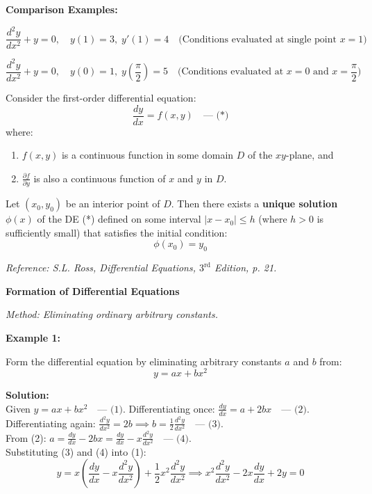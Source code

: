 \documentclass[11pt,a4paper]{article}
\newcommand{\Heading}[1]{\vspace{0.3cm}\noindent\textbf{\textcolor{AcademicGreen}{\large #1}}\par\vspace{0.15cm}}
\begin{document}
\Heading{Comparison Examples:}
\begin{description}[leftmargin=0.4cm, font=\normalfont\bfseries\textcolor{DarkGreen}]
    \item[Initial Value Problem (IVP):]
    \[ \frac{d^2y}{dx^2} + y = 0, \quad y(1) = 3, \; y'(1) = 4 \quad \text{(Conditions evaluated at single point } x=1) \]
    
    \item[Boundary Value Problem (BVP):]
    \[ \frac{d^2y}{dx^2} + y = 0, \quad y(0) = 1, \; y\left(\frac{\pi}{2}\right) = 5 \quad \text{(Conditions evaluated at } x=0 \text{ and } x=\frac{\pi}{2}) \]
\end{description}

\vspace{0.3cm}
\begin{tcolorbox}[theorembox, title={Existence and Uniqueness Theorem}]
Consider the first-order differential equation:
\[ \frac{dy}{dx} = f(x, y) \quad \text{--- (*)} \]
where:
\begin{enumerate}[label=\arabic*)]
    \item $f(x, y)$ is a continuous function in some domain $D$ of the $xy$-plane, and
    \item $\frac{\partial f}{\partial y}$ is also a continuous function of $x$ and $y$ in $D$.
\end{enumerate}
Let $(x_0, y_0)$ be an interior point of $D$. Then there exists a \textbf{unique solution} $\phi(x)$ of the DE (*) defined on some interval $|x - x_0| \le h$ (where $h > 0$ is sufficiently small) that satisfies the initial condition:
\[ \phi(x_0) = y_0 \]
\end{tcolorbox}
\textit{Reference: S.L. Ross, Differential Equations, $3^{\text{rd}}$ Edition, p. 21.}

\newpage


\Heading{Formation of Differential Equations}
\textit{Method: Eliminating ordinary arbitrary constants.}

\Heading{Example 1:}
Form the differential equation by eliminating arbitrary constants $a$ and $b$ from:
\[ y = ax + bx^2 \]

\noindent\textbf{Solution:} \\
Given $y = ax + bx^2 \quad \text{--- (1)}$.
Differentiating once: $\frac{dy}{dx} = a + 2bx \quad \text{--- (2)}$. \\
Differentiating again: $\frac{d^2y}{dx^2} = 2b \implies b = \frac{1}{2}\frac{d^2y}{dx^2} \quad \text{--- (3)}$. \\
From (2): $a = \frac{dy}{dx} - 2bx = \frac{dy}{dx} - x\frac{d^2y}{dx^2} \quad \text{--- (4)}$. \\
Substituting (3) and (4) into (1):
\[ y = x\left(\frac{dy}{dx} - x\frac{d^2y}{dx^2}\right) + \frac{1}{2}x^2\frac{d^2y}{dx^2} \implies x^2\frac{d^2y}{dx^2} - 2x\frac{dy}{dx} + 2y = 0 \]
\end{document}
